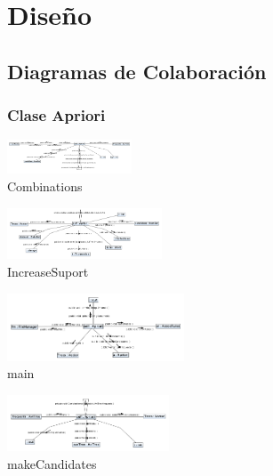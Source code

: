 
% 

\begin{figure}
\section{Dise\~no}
\subsection{Diagramas de Colaboraci\'on}
\subsubsection{Clase Apriori}
\centering
\includegraphics[angle=90, width=0.33\textwidth]{imgsColaboracion/Apriori/Combinations.png}
\caption{Combinations}
\end{figure}
\newpage
\begin{figure}
\centering
\includegraphics[angle=90, width=0.41\textwidth]{imgsColaboracion/Apriori/IncreaseSuport.png}
\caption{IncreaseSuport}
\end{figure}
\newpage
\begin{figure}
\centering
\includegraphics[angle=90, width=0.47\textwidth]{imgsColaboracion/Apriori/main.png}
\caption{main}
\end{figure}
\newpage
\begin{figure}
\centering
\includegraphics[angle=90, width=0.43\textwidth]{imgsColaboracion/Apriori/makeCandidates.png}
\caption{makeCandidates}
\end{figure}

